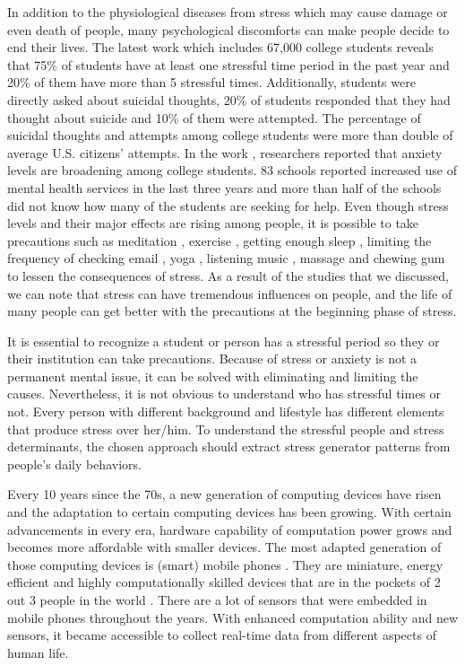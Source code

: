 \documentclass[12pt,oneandhalf,chaparabic,lfm,phd,eng,oneside,pntc]{gsufbe}
\begin{document}
In addition to the physiological diseases from stress which may cause damage or even death of people, many psychological discomforts can make people decide to end their lives. The latest work \cite{liu2019prevalence} which includes 67,000 college students reveals that 75\% of students have at least one stressful time period in the past year and 20\% of them have more than 5 stressful times. Additionally, students were directly asked about suicidal thoughts, 20\% of students responded that they had thought about suicide and 10\% of them were attempted. The percentage of suicidal thoughts and attempts among college students were more than double of average U.S. citizens’ attempts. In the work \cite{landow2006stress}, researchers reported that anxiety levels are broadening among college students. 83 schools reported increased use of mental health services in the last three years and more than half of the schools did not know how many of the students are seeking for help. Even though stress levels and their major effects are rising among people, it is possible to take precautions such as meditation \cite{holzel2009stress, smith2013effects}, exercise \cite{viveros2018stress}, getting enough sleep \cite{kushlev2015checking}, limiting the frequency of checking email \cite{brown2009yoga}, yoga \cite{cervellin2011music}, listening music \cite{rapaport2010preliminary}, massage \cite{scholey2009chewing} and chewing gum \cite{fehske2011global} to lessen the consequences of stress. As a result of the studies that we discussed, we can note that stress can have tremendous influences on people, and the life of many people can get better with the precautions at the beginning phase of stress.

It is essential to recognize a student or person has a stressful period so they or their institution can take precautions. Because of stress or anxiety is not a permanent mental issue, it can be solved with eliminating and limiting the causes. Nevertheless, it is not obvious to understand who has stressful times or not. Every person with different background and lifestyle has different elements that produce stress over her/him. To understand the stressful people and stress determinants, the chosen approach should extract stress generator patterns from people’s daily behaviors.

Every 10 years since the 70s, a new generation of computing devices have risen and the adaptation to certain computing devices has been growing. With certain advancements in every era, hardware capability of computation power grows and becomes more affordable with smaller devices. The most adapted generation of those computing devices is (smart) mobile phones \cite{sanou2017ict}. They are miniature, energy efficient and highly computationally skilled devices that are in the pockets of 2 out 3 people in the world \cite{dasilva2019correlates}. There are a lot of sensors that were embedded in mobile phones throughout the years. With enhanced computation ability and new sensors, it became accessible to collect real-time data from different aspects of human life. 
\end{document}
